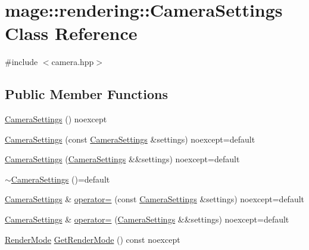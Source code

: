 \hypertarget{classmage_1_1rendering_1_1_camera_settings}{}\section{mage\+:\+:rendering\+:\+:Camera\+Settings Class Reference}
\label{classmage_1_1rendering_1_1_camera_settings}


{\ttfamily \#include $<$camera.\+hpp$>$}

\subsection*{Public Member Functions}
\begin{DoxyCompactItemize}
\item 
\hyperlink{classmage_1_1rendering_1_1_camera_settings_a46be4ca54bacf2597672a2e944f9fef6}{Camera\+Settings} () noexcept
\item 
\hyperlink{classmage_1_1rendering_1_1_camera_settings_af0501d9365b74ce296a517b40a13e81e}{Camera\+Settings} (const \hyperlink{classmage_1_1rendering_1_1_camera_settings}{Camera\+Settings} \&settings) noexcept=default
\item 
\hyperlink{classmage_1_1rendering_1_1_camera_settings_a08e6d9c319feb6af0c14f4d057220da8}{Camera\+Settings} (\hyperlink{classmage_1_1rendering_1_1_camera_settings}{Camera\+Settings} \&\&settings) noexcept=default
\item 
\hyperlink{classmage_1_1rendering_1_1_camera_settings_a0e5badc4e959b8ddad0d7df2da4c934f}{$\sim$\+Camera\+Settings} ()=default
\item 
\hyperlink{classmage_1_1rendering_1_1_camera_settings}{Camera\+Settings} \& \hyperlink{classmage_1_1rendering_1_1_camera_settings_a8cc59c883ea4c45a6bb7e9dc728856fd}{operator=} (const \hyperlink{classmage_1_1rendering_1_1_camera_settings}{Camera\+Settings} \&settings) noexcept=default
\item 
\hyperlink{classmage_1_1rendering_1_1_camera_settings}{Camera\+Settings} \& \hyperlink{classmage_1_1rendering_1_1_camera_settings_a28ae670d467adfc74ef8929f24b2e615}{operator=} (\hyperlink{classmage_1_1rendering_1_1_camera_settings}{Camera\+Settings} \&\&settings) noexcept=default
\item 
\hyperlink{namespacemage_1_1rendering_aeb14ce7610cc9391f4e01be027b91dcc}{Render\+Mode} \hyperlink{classmage_1_1rendering_1_1_camera_settings_ab1421b9c47b7eafbebd0619c5b5116b5}{Get\+Render\+Mode} () const noexcept
\item 

\end{DoxyCompactItemize}
